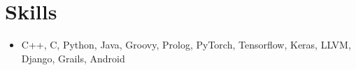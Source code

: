 \documentclass[letterpaper,11pt]{article}
\newcommand{\resumeSubHeadingListStart}{\begin{itemize}[leftmargin=*]}
\newcommand{\resumeSubHeadingListEnd}{\end{itemize}}
\begin{document}
%
\section{Skills}
  \resumeSubHeadingListStart
    \item{
      \textbf{}{C++, C, Python, Java, Groovy, Prolog, PyTorch, Tensorflow, Keras, LLVM, Django, Grails, Android}
      \hfill
    }
  \resumeSubHeadingListEnd
%
\end{document}
